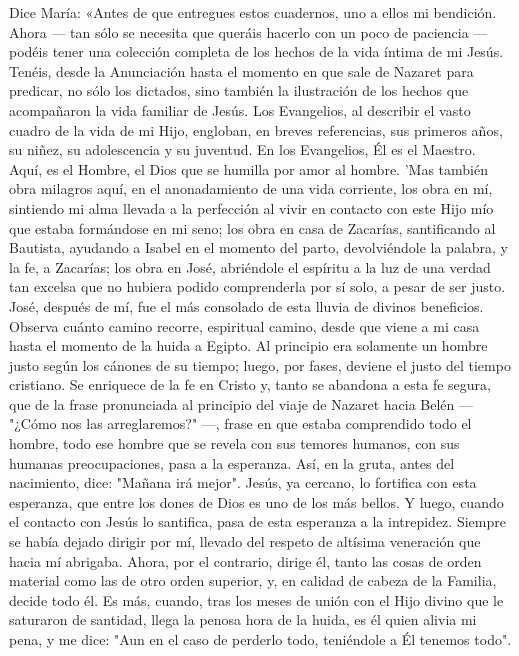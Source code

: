 \documentclass[12pt]{book} %
\begin{document}
 
Dice María: 
«Antes de que entregues estos cuadernos, uno a ellos mi bendición.                          
Ahora — tan sólo se necesita que queráis hacerlo con un poco de paciencia — podéis tener una colección completa de 
los hechos de la vida íntima de mi Jesús. Tenéis, desde la Anunciación hasta el momento en que sale de Nazaret para predicar, no sólo los dictados, sino también la ilustración de los hechos que acompañaron la vida familiar de Jesús. 
Los Evangelios, al describir el vasto cuadro de la vida de mi Hijo, engloban, en breves referencias, sus primeros años, su 
niñez, su adolescencia y su juventud. En los Evangelios, Él es el Maestro. Aquí, es el Hombre, el Dios que se humilla por amor al hombre. 'Mas también obra milagros aquí, en el anonadamiento de una vida corriente, los obra en mí, sintiendo mi alma llevada a la perfección al vivir en contacto con este Hijo mío que estaba formándose en mi seno; los obra en casa de Zacarías, santificando al Bautista, ayudando a Isabel en el momento del parto, devolviéndole la palabra, y la fe, a Zacarías; los obra en José, abriéndole el espíritu a la luz de una verdad tan excelsa que no hubiera podido comprenderla por sí solo, a pesar de ser justo. José, después de mí, fue el más consolado de esta lluvia de divinos beneficios. 
Observa cuánto camino recorre, espiritual camino, desde que viene a mi casa hasta el momento de la huida a Egipto. Al 
principio era solamente un hombre justo según los cánones de su tiempo; luego, por fases, deviene el justo del tiempo cristiano. Se enriquece de la fe en Cristo y, tanto se abandona a esta fe segura, que de la frase pronunciada al principio del viaje de Nazaret hacia Belén — "¿Cómo nos las arreglaremos?" —, frase en que estaba comprendido todo el hombre, todo ese hombre que se revela con sus temores humanos, con sus humanas preocupaciones, pasa a la esperanza. Así, en la gruta, antes del nacimiento, dice: "Mañana irá mejor". Jesús, ya cercano, lo fortifica con esta esperanza, que entre los dones de Dios es uno de los más bellos. Y luego, cuando el contacto con Jesús lo santifica, pasa de esta esperanza a la intrepidez. Siempre se había dejado dirigir por mí, llevado del respeto de altísima veneración que hacia mí abrigaba. Ahora, por el contrario, dirige él, tanto las cosas de orden material como las de otro orden superior, y, en calidad de cabeza de la Familia, decide todo él. Es más, cuando, tras los meses de unión con el Hijo divino que le saturaron de santidad, llega la penosa hora de la huida, es él quien alivia mi pena, y me dice: "Aun en el caso de perderlo todo, teniéndole a Él tenemos todo". 
\end{document}

